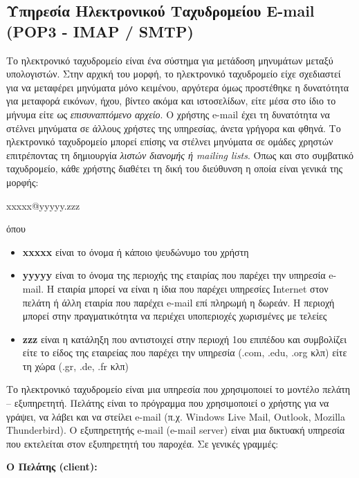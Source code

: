 %
%
\subsection{Υπηρεσία Ηλεκτρονικού Ταχυδρομείου E-mail (POP3 - IMAP / SMTP)}

Το ηλεκτρονικό ταχυδρομείο είναι ένα σύστημα για μετάδοση μηνυμάτων μεταξύ υπολογιστών. Στην αρχική του μορφή, το ηλεκτρονικό ταχυδρομείο είχε σχεδιαστεί για να μεταφέρει μηνύματα μόνο κειμένου, αργότερα όμως προστέθηκε η δυνατότητα για μεταφορά εικόνων, ήχου, βίντεο ακόμα και ιστοσελίδων, είτε μέσα στο ίδιο το μήνυμα είτε ως \emph{επισυναπτόμενο αρχείο}. Ο χρήστης e-mail έχει τη δυνατότητα να στέλνει μηνύματα σε άλλους χρήστες της υπηρεσίας, άνετα γρήγορα και φθηνά. Το ηλεκτρονικό ταχυδρομείο μπορεί επίσης να στέλνει μηνύματα σε ομάδες χρηστών επιτρέποντας τη δημιουργία \emph{λιστών διανομής ή mailing lists}. Όπως και στο συμβατικό ταχυδρομείο, κάθε χρήστης διαθέτει τη δική του διεύθυνση η οποία είναι γενικά της μορφής:

\begin{center}
xxxxx@yyyyy.zzz
\end{center}

όπου

\begin{itemize}
\item \textbf{xxxxx} είναι το όνομα ή κάποιο ψευδώνυμο του χρήστη
\item \textbf{yyyyy} είναι το όνομα της περιοχής της εταιρίας που παρέχει την υπηρεσία e-mail. Η εταιρία μπορεί να είναι η ίδια που παρέχει υπηρεσίες Internet στον πελάτη ή άλλη εταιρία που παρέχει e-mail επί πληρωμή η δωρεάν. Η περιοχή μπορεί στην πραγματικότητα να περιέχει υποπεριοχές χωρισμένες με τελείες
\item \textbf{zzz} είναι η κατάληξη που αντιστοιχεί στην περιοχή 1ου επιπέδου και συμβολίζει είτε το είδος της εταιρείας που παρέχει την υπηρεσία (.com, .edu, .org κλπ) είτε τη χώρα (.gr, .de, .fr κλπ)
\end{itemize}

Το ηλεκτρονικό ταχυδρομείο είναι μια υπηρεσία που χρησιμοποιεί το μοντέλο πελάτη -- εξυπηρετητή. Πελάτης είναι το πρόγραμμα που χρησιμοποιεί ο χρήστης για να γράψει, να λάβει και να στείλει e-mail (π.χ. Windows Live Mail, Outlook, Mozilla Thunderbird). Ο εξυπηρετητής e-mail (e-mail server) είναι μια δικτυακή υπηρεσία που εκτελείται στον εξυπηρετητή του παροχέα. Σε γενικές γραμμές:

\textbf{Ο Πελάτης (client):}


